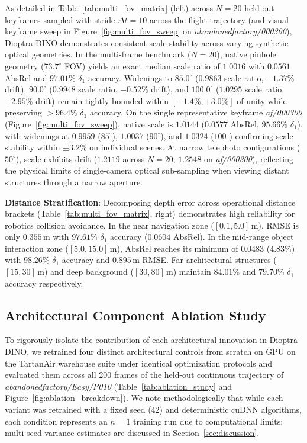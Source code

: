 As detailed in Table~\ref{tab:multi_fov_matrix} (left) across $N=20$ held-out keyframes sampled with stride $\Delta t = 10$ across the flight trajectory (and visual keyframe sweep in Figure~\ref{fig:multi_fov_sweep} on \textit{abandonedfactory/000300}), Dioptra-DINO demonstrates consistent scale stability across varying synthetic optical geometries. In the multi-frame benchmark ($N=20$), native pinhole geometry ($73.7^\circ$ FOV) yields an exact median scale ratio of $1.0016$ with $0.0561$ AbsRel and $97.01\%$ $\delta_1$ accuracy. Widenings to $85.0^\circ$ ($0.9863$ scale ratio, $-1.37\%$ drift), $90.0^\circ$ ($0.9948$ scale ratio, $-0.52\%$ drift), and $100.0^\circ$ ($1.0295$ scale ratio, $+2.95\%$ drift) remain tightly bounded within $[-1.4\%, +3.0\%]$ of unity while preserving $>96.4\%$ $\delta_1$ accuracy. On the single representative keyframe \textit{af/000300} (Figure~\ref{fig:multi_fov_sweep}), native scale is $1.0144$ ($0.0577$ AbsRel, $95.66\%$ $\delta_1$), with widenings at $0.9959$ ($85^\circ$), $1.0037$ ($90^\circ$), and $1.0324$ ($100^\circ$) confirming scale stability within $\pm 3.2\%$ on individual scenes. At narrow telephoto configurations ($50^\circ$), scale exhibits drift ($1.2119$ across $N=20$; $1.2548$ on \textit{af/000300}), reflecting the physical limits of single-camera optical sub-sampling when viewing distant structures through a narrow aperture.


\noindent\textbf{Distance Stratification}: Decomposing depth error across operational distance brackets (Table~\ref{tab:multi_fov_matrix}, right) demonstrates high reliability for robotics collision avoidance. In the near navigation zone ($[0.1, 5.0]$\,m), RMSE is only $0.355$\,m with $97.61\%$ $\delta_1$ accuracy ($0.0604$ AbsRel). In the mid-range object interaction zone ($[5.0, 15.0]$\,m), AbsRel reaches its minimum of $0.0483$ ($4.83\%$) with $98.26\%$ $\delta_1$ accuracy and $0.895$\,m RMSE. Far architectural structures ($[15, 30]$\,m) and deep background ($[30, 80]$\,m) maintain $84.01\%$ and $79.70\%$ $\delta_1$ accuracy respectively.

\subsection{Architectural Component Ablation Study}
\label{sec:ablation_study}

To rigorously isolate the contribution of each architectural innovation in Dioptra-DINO, we retrained four distinct architectural controls from scratch on GPU on the TartanAir warehouse suite under identical optimization protocols and evaluated them across all 200 frames of the held-out continuous trajectory of \textit{abandonedfactory/Easy/P010} (Table~\ref{tab:ablation_study} and Figure~\ref{fig:ablation_breakdown}). We note methodologically that while each variant was retrained with a fixed seed ($42$) and deterministic cuDNN algorithms, each condition represents an $n=1$ training run due to computational limits; multi-seed variance estimates are discussed in Section~\ref{sec:discussion}.


